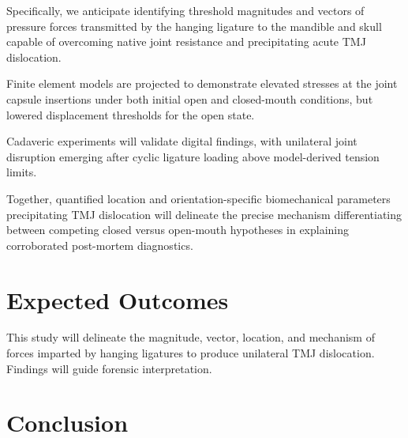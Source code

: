 \documentclass{article}
\begin{document}
Specifically, we anticipate identifying threshold magnitudes and vectors of pressure forces transmitted by the hanging ligature to the mandible and skull capable of overcoming native joint resistance and precipitating acute TMJ dislocation. 

Finite element models are projected to demonstrate elevated stresses at the joint capsule insertions under both initial open and closed-mouth conditions, but lowered displacement thresholds for the open state.

Cadaveric experiments will validate digital findings, with unilateral joint disruption emerging after cyclic ligature loading above model-derived tension limits. 

Together, quantified location and orientation-specific biomechanical parameters precipitating TMJ dislocation will delineate the precise mechanism differentiating between competing closed versus open-mouth hypotheses in explaining corroborated post-mortem diagnostics.


%
\section{Expected Outcomes}

This study will delineate the magnitude, vector, location, and mechanism of forces imparted by hanging ligatures to produce unilateral TMJ dislocation. Findings will guide forensic interpretation.



\section{Conclusion}
\end{document}
